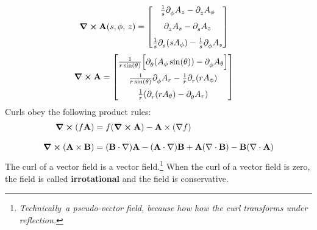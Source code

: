        \begin{align}
            \curl \vb{A}(s,\phi,\,z) 
            &= 
            \begin{bmatrix}
                \oo{s} \pder*{A_z}{\phi} - \pder*{A_\phi}{z}
                \\[0.25 cm]
                \pder*{A_s}{z} - \pder*{A_z}{s}
                \\[0.25 cm]
                \oo{s}\pder*{s}\qty(s A_\phi) - \oo{s}\pder*{A_s}{\phi}
            \end{bmatrix}
        \end{align}
        \begin{align}
            &\curl \vb{A}= 
               \begin{bmatrix}
                    \oo{r\sin(\theta)}\qty[\pder*{\theta}\qty(A_\phi\sin(\theta))-\pder*{A_\theta}{\phi}]
                    \\[0.25 cm]
                    \oo{r\sin(\theta)}\pder*{A_r}{\phi}-\oo{r}\pder*{r}\qty(r A_{\phi})
                    \\[0.25 cm]
                    \frac{1}{r}\qty(\pder*{r}\qty(rA_{\theta}) - \pder*{\theta}A_r)
                \end{bmatrix}
        \end{align}
        Curls obey the following product rules:
        \begin{align*}
        \curl (f\vb{A}) &= f(\curl \vb{A}) - \vb{A} \times (\nabla f)
        \\[0.3 cm]
        \curl (\vb{A} \times \vb{B}) &= (\vb{B} \cdot \nabla)\vb{A} - (\vb{A} \cdot \nabla)\vb{B} + \vb{A}(\nabla \cdot \vb{B}) - \vb{B}(\nabla \cdot \vb{A})
        \end{align*}
        The curl of a vector field is a vector field.\footnote{\sl Technically\rm\ a pseudo-vector field, because how how the curl transforms under reflection.} When the curl of a vector field is zero, the field is called {\bf irrotational} and the field is conservative.
    \newpage
